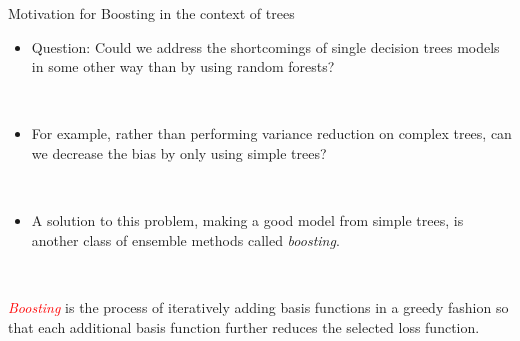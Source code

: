 \documentclass[
  10pt,
  ignorenonframetext,
]{beamer}
\providecommand{\tightlist}{%
  \setlength{\itemsep}{0pt}\setlength{\parskip}{0pt}}
\begin{document}
\begin{frame}
\begin{block}{Motivation for Boosting in the context of trees}
\label{motivation-for-boosting-in-the-context-of-trees}
\(~\)

\begin{itemize}
\tightlist
\item
  Question: Could we address the shortcomings of single decision trees
  models in some other way than by using random forests?
\end{itemize}

\(~\)

\begin{itemize}
\tightlist
\item
  For example, rather than performing variance reduction on complex
  trees, can we decrease the bias by only using simple trees?
\end{itemize}

\(~\)

\begin{itemize}
\tightlist
\item
  A solution to this problem, making a good model from simple trees, is
  another class of ensemble methods called \emph{boosting}.
\end{itemize}

\(~\)

\emph{\textcolor{red}{Boosting}} is the process of iteratively adding
basis functions in a greedy fashion so that each additional basis
function further reduces the selected loss function.
\end{block}
\end{frame}
\end{document}
